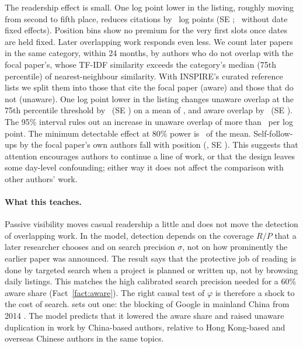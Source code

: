 The readership effect is small. One log point lower in the listing, roughly
moving from second to fifth place, reduces citations by \empRankCites\ log points
(SE \empRankCitesSE; \empRankCitesMain\ without date fixed effects). Position bins show
no premium for the very first slots once dates are held fixed. Later overlapping
work responds even less. We count later papers in the same category, within 24
months, by authors who do not overlap with the focal paper's, whose TF-IDF
similarity exceeds the category's median (75th percentile) of nearest-neighbour
similarity. With INSPIRE's curated reference lists we split them into those
that cite the focal paper (aware) and those that do not (unaware). One log point
lower in the listing changes unaware overlap at the 75th percentile threshold by
\empRankUsevfive\ (SE \empRankUsevfiveSE) on a mean of \empRankUsevfiveMean, and
aware overlap by \empRankAsevfive\ (SE \empRankAsevfiveSE). The 95\% interval
rules out an increase in unaware overlap of more than \empRankUsevfiveUB\ per log
point. The minimum detectable effect at 80\% power is \empRankUsevfiveMDE\ of the
mean. Self-follow-ups by the focal paper's own authors fall with position
(\empRankSelf, SE \empRankSelfSE). This suggests that attention encourages authors
to continue a line of work, or that the design leaves some day-level confounding;
either way it does not affect the comparison with other authors' work.

\paragraph{What this teaches.} Passive visibility moves casual readership a little
and does not move the detection of overlapping work. In the model, detection
depends on the coverage $R/P$ that a later researcher chooses and on search
precision $\sigma$, not on how prominently the earlier paper was announced. The
result says that the protective job of reading is done by targeted search when a
project is planned or written up, not by browsing daily listings. This matches
the high calibrated search precision needed for a 60\% aware share
(Fact~\ref{fact:aware}). The right causal test of $\varphi$ is therefore a
shock to the cost of search.  sets out one: the blocking
of Google in mainland China from 2014 \citep{zhengwang2020}. The model predicts
that it lowered the aware share and raised unaware duplication in work by
China-based authors, relative to Hong Kong-based and overseas Chinese authors
in the same topics.

